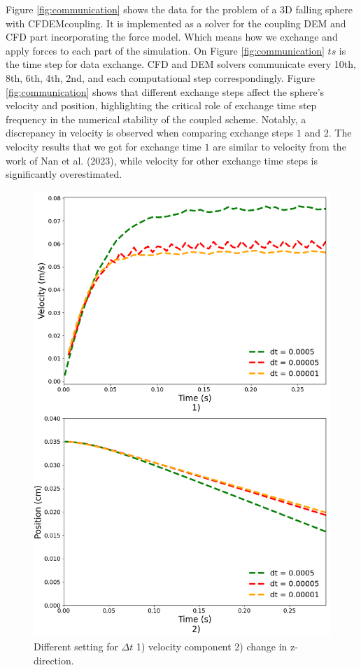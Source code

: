 Figure \ref{fig:communication} shows the data for the problem of a 3D falling sphere with CFDEMcoupling. It is implemented as a solver for the coupling DEM and CFD part incorporating the force model. Which means how we exchange and apply forces to each part of the simulation. On Figure \ref{fig:communication} $ts$ is the time step for data exchange. CFD and DEM solvers communicate every 10th, 8th, 6th, 4th, 2nd, and each computational step correspondingly. Figure \ref{fig:communication} shows that different exchange steps affect the sphere's velocity and position, highlighting the critical role of exchange time step frequency in the numerical stability of the coupled scheme. Notably, a discrepancy in velocity is observed when comparing exchange steps $1$ and $2$. The velocity results that we got for exchange time $1$ are similar to velocity from the work of Nan et al. (2023)\cite{nan2023high}, while velocity for other exchange time steps is significantly overestimated.

\begin{figure}[H]
    \centering
    \includegraphics[width=12cm]{ GWU_Thesis_Sarmakeeva/Images/chap3/nan_simulation_192000_cells_dt_different.png }
    \caption{ Different setting for $\Delta t$ 1) velocity component 2) change in z-direction.}
    \label{fig:diff_dt}
\end{figure}

